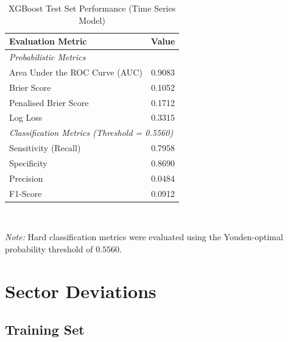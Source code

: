\documentclass{report}\usepackage[]{graphicx}\usepackage[]{xcolor}
\begin{document}
\begin{table}[h]
    \centering
    \caption{XGBoost Test Set Performance (Time Series Model)}
    \label{tab:xgb_test_eval}
    \begin{tabular}{lc}
        \hline
        \textbf{Evaluation Metric} & \textbf{Value} \\
        \hline
        \multicolumn{2}{l}{\textit{Probabilistic Metrics}} \\
        Area Under the ROC Curve (AUC) & 0.9083 \\
        Brier Score & 0.1052 \\
        Penalised Brier Score & 0.1712 \\
        Log Loss & 0.3315 \\
        \hline
        \multicolumn{2}{l}{\textit{Classification Metrics (Threshold = 0.5560)}} \\
        Sensitivity (Recall) & 0.7958 \\
        Specificity & 0.8690 \\
        Precision & 0.0484 \\
        F1-Score & 0.0912 \\
        \hline
    \end{tabular}
    \\[1ex]
    \raggedright
    \footnotesize \textit{Note:} Hard classification metrics were evaluated using the Youden-optimal probability threshold of $0.5560$.
\end{table}


\section{Sector Deviations}

\subsection{Training Set}
\end{document}
